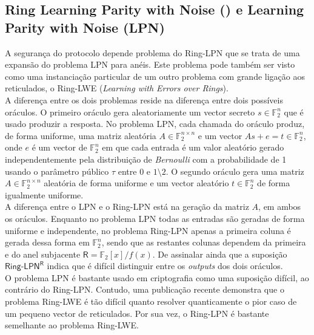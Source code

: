 \subsection{Ring Learning Parity with Noise (\RingLPN) e Learning Parity with Noise (\textsf{LPN})}
A segurança do protocolo depende problema do \textsf{Ring-LPN} que se trata de uma expansão do problema \textsf{LPN} para anéis. Este problema pode também ser visto como uma instanciação particular de um outro problema com grande ligação aos reticulados, o \textsf{Ring-LWE} (\textit{Learning with Errors over Rings}).\\
A diferença entre os dois problemas reside na diferença entre dois possíveis oráculos. O primeiro oráculo gera aleatoriamente um vector secreto $s \in \mathbb{F}_2^n$ que é usado produzir a resposta. No problema \textsf{LPN}, cada chamada do oráculo produz, de forma uniforme, uma matriz aleatória $A \in \mathbb{F}_2^{n \times n}$ e um vector $As + e = t \in \mathbb{F}_2^n$, onde $e$ é um vector de $\mathbb{F}_2^n$ em que cada entrada é um valor aleatório gerado independentemente pela distribuição de \textit{Bernoulli} com a probabilidade de 1 usando o parâmetro público $\tau$ entre $0$ e $1 \setminus 2$. O segundo oráculo gera uma matriz $A \in \mathbb{F}_2^{n \times n}$ aleatória de forma uniforme e um vector aleatório $t \in \mathbb{F}_2^n$ de forma igualmente uniforme.\\
A diferença entre o \textsf{LPN} e o \textsf{Ring-LPN} está na geração da matriz $A$, em ambos os oráculos. Enquanto no problema \textsf{LPN} todas as entradas são geradas de forma uniforme e independente, no problema \textsf{Ring-LPN} apenas a primeira coluna é gerada dessa forma em $\mathbb{F}_2^n$, sendo que as restantes colunas dependem da primeira e do anel subjacente $\mathsf{R} = \mathbb{F}_2[x]/f(x)$. De assinalar ainda que a suposição $\textsf{Ring-LPN}^\mathsf{R}$ indica que é difícil distinguir entre os \textit{outputs} dos dois oráculos.\\
O problema \textsf{LPN} é bastante usado em criptografia como uma suposição difícil, ao contrário do \textsf{Ring-LPN}. Contudo, uma publicação recente demonstra que o problema \textsf{Ring-LWE} é tão difícil quanto resolver quanticamente o pior caso de um pequeno vector de reticulados. Por sua vez, o 
\textsf{Ring-LPN} é bastante semelhante ao problema \textsf{Ring-LWE}.
